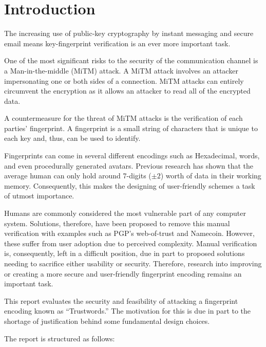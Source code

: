 \chapter{Introduction}
\label{cha:Introduction}

The increasing use of public-key cryptography by instant messaging and secure email means key-fingerprint  verification is an ever more important task. 

One of the most significant risks to the security of the communication channel is a Man-in-the-middle (MiTM) attack. A MiTM attack involves an attacker impersonating one or both sides of a connection. MiTM attacks can entirely circumvent the encryption as it allows an attacker to read all of the encrypted data. 

A countermeasure for the threat of MiTM attacks is the verification of each parties’ fingerprint. A fingerprint is a small string of characters that is unique to each key and, thus, can be used to identify.

Fingerprints can come in several different encodings such as Hexadecimal, words, and even procedurally generated avatars. Previous research has shown that the average human can only hold around 7-digits ($\pm 2$) worth of data in their working memory\cite{miller1956magical}. Consequently, this makes the designing of user-friendly schemes a task of utmost importance.

Humans are commonly considered the most vulnerable part of any computer system. Solutions, therefore, have been proposed to remove this manual verification with examples such as PGP's web-of-trust\cite{callas1998openpgp} and Namecoin\cite{kalodner2015empirical}. However, these suffer from user adoption due to perceived complexity. Manual verification is, consequently, left in a difficult position, due in part to proposed solutions needing to sacrifice either usability or security. Therefore, research into improving or creating a more secure and user-friendly fingerprint encoding remains an important task.

This report evaluates the security and feasibility of attacking a fingerprint encoding known as “Trustwords.” The motivation for this is due in part to the shortage of justification behind some fundamental design choices.


\newpage
The report is structured as follows:

